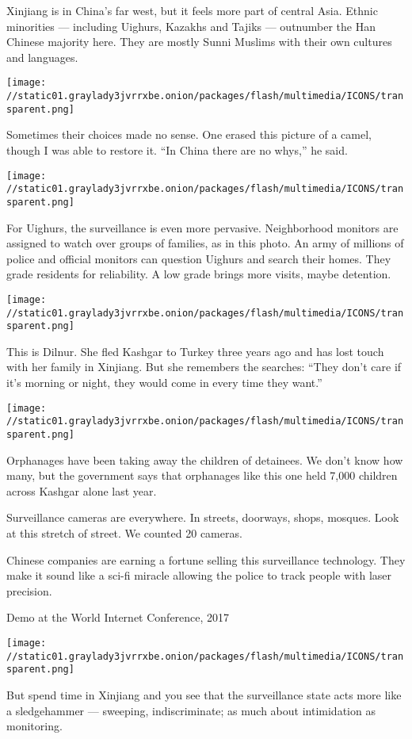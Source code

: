 Xinjiang is in China's far west, but it feels more part of central Asia.
Ethnic minorities --- including Uighurs, Kazakhs and Tajiks ---
outnumber the Han Chinese majority here. They are mostly Sunni Muslims
with their own cultures and languages.

\texttt{[image: //static01.graylady3jvrrxbe.onion/packages/flash/multimedia/ICONS/transparent.png]}

Sometimes their choices made no sense. One erased this picture of a
camel, though I was able to restore it. ``In China there are no whys,''
he said.

\texttt{[image: //static01.graylady3jvrrxbe.onion/packages/flash/multimedia/ICONS/transparent.png]}

For Uighurs, the surveillance is even more pervasive. Neighborhood
monitors are assigned to watch over groups of families, as in this
photo. An army of millions of police and official monitors can question
Uighurs and search their homes. They grade residents for reliability. A
low grade brings more visits, maybe detention.

\texttt{[image: //static01.graylady3jvrrxbe.onion/packages/flash/multimedia/ICONS/transparent.png]}

This is Dilnur. She fled Kashgar to Turkey three years ago and has lost
touch with her family in Xinjiang. But she remembers the searches:
``They don't care if it's morning or night, they would come in every
time they want.''

\texttt{[image: //static01.graylady3jvrrxbe.onion/packages/flash/multimedia/ICONS/transparent.png]}

Orphanages have been taking away the children of detainees. We don't
know how many, but the government says that orphanages like this one
held 7,000 children across Kashgar alone last year.

Surveillance cameras are everywhere. In streets, doorways, shops,
mosques. Look at this stretch of street. We counted 20 cameras.

Chinese companies are earning a fortune selling this surveillance
technology. They make it sound like a sci-fi miracle allowing the police
to track people with laser precision.

Demo at the World Internet Conference, 2017

\texttt{[image: //static01.graylady3jvrrxbe.onion/packages/flash/multimedia/ICONS/transparent.png]}

But spend time in Xinjiang and you see that the surveillance state acts
more like a sledgehammer --- sweeping, indiscriminate; as much about
intimidation as monitoring.

